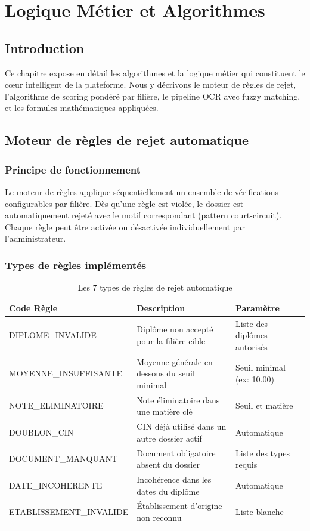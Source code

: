 \chapter{Logique Métier et Algorithmes}
\label{chapitre-3-logique-metier-et-algorithmes}

\section{Introduction}
Ce chapitre expose en détail les algorithmes et la logique métier qui constituent le cœur intelligent de la plateforme. Nous y décrivons le moteur de règles de rejet, l'algorithme de scoring pondéré par filière, le pipeline OCR avec fuzzy matching, et les formules mathématiques appliquées.

\section{Moteur de règles de rejet automatique}
\subsection{Principe de fonctionnement}
Le moteur de règles applique séquentiellement un ensemble de vérifications configurables par filière. Dès qu'une règle est violée, le dossier est automatiquement rejeté avec le motif correspondant (pattern court-circuit). Chaque règle peut être activée ou désactivée individuellement par l'administrateur.

\subsection{Types de règles implémentés}
\begin{table}[htbp]
\centering
\caption{Les 7 types de règles de rejet automatique}
\label{tab:regles-rejet}
\begin{tabular}{p{4.5cm} p{6cm} p{3.5cm}}
\toprule
\textbf{Code Règle} & \textbf{Description} & \textbf{Paramètre} \\
\midrule
DIPLOME\_INVALIDE & Diplôme non accepté pour la filière cible & Liste des diplômes autorisés \\
MOYENNE\_INSUFFISANTE & Moyenne générale en dessous du seuil minimal & Seuil minimal (ex: 10.00) \\
NOTE\_ELIMINATOIRE & Note éliminatoire dans une matière clé & Seuil et matière \\
DOUBLON\_CIN & CIN déjà utilisé dans un autre dossier actif & Automatique \\
DOCUMENT\_MANQUANT & Document obligatoire absent du dossier & Liste des types requis \\
DATE\_INCOHERENTE & Incohérence dans les dates du diplôme & Automatique \\
ETABLISSEMENT\_INVALIDE & Établissement d'origine non reconnu & Liste blanche \\
\bottomrule
\end{tabular}
\end{table}


